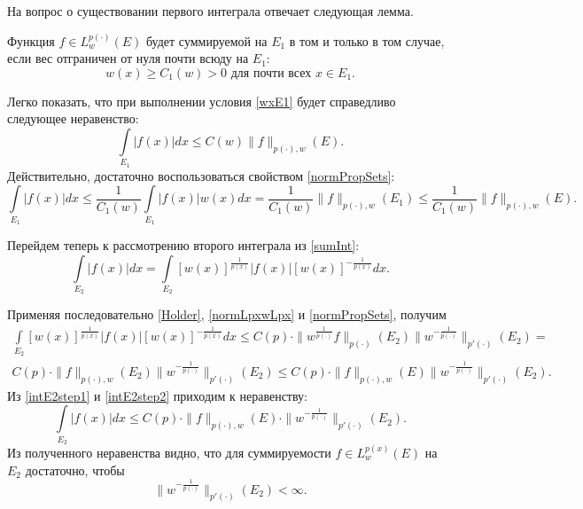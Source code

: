 На вопрос о существовании первого интеграла отвечает следующая лемма.
\begin{lemma}
Функция $f \in L^{p(\cdot)}_w(E)$ будет суммируемой на $E_1$ в том и только в том случае, если вес отграничен от нуля почти всюду на $E_1$:
\begin{equation}\label{wxE1}
  w(x) \ge C_1(w) > 0 \text{ для почти всех } x \in E_1.
\end{equation}
\end{lemma}



Легко показать, что при выполнении условия \eqref{wxE1} будет справедливо следующее неравенство:
\begin{equation}\label{intE1}
  \int\limits_{E_1} |f(x)|dx \le C(w)\|f\|_{p(\cdot),w}(E).
\end{equation}
Действительно, достаточно воспользоваться свойством \ref{normPropSets}:
\begin{equation*}
  \int\limits_{E_1} |f(x)|dx \le
  \frac{1}{C_1(w)}\int\limits_{E_1} |f(x)|w(x)dx =
  \frac{1}{C_1(w)} \|f\|_{p(\cdot),w}(E_1) \le
  \frac{1}{C_1(w)} \|f\|_{p(\cdot),w}(E).
\end{equation*}

Перейдем теперь к рассмотрению второго интеграла из \eqref{sumInt}:
\begin{equation}\label{intE2step1}
  \int\limits_{E_2} |f(x)|dx=
  \int\limits_{E_2} [w(x)]^{\frac{1}{p(x)}}|f(x)|[w(x)]^{-\frac{1}{p(x)}}dx.
\end{equation}

Применяя последовательно \ref{Holder}, \ref{normLpxwLpx} и \ref{normPropSets}, получим
\begin{multline}\label{intE2step2}
  \int\limits_{E_2} [w(x)]^{\frac{1}{p(x)}}|f(x)|[w(x)]^{-\frac{1}{p(x)}}dx \le
  C(p) \cdot \|w^{\frac{1}{p(\cdot)}}f\|_{p(\cdot)}(E_2) \|w^{-\frac{1}{p(\cdot)}}\|_{p'(\cdot)}(E_2)= \\
  C(p) \cdot \|f\|_{p(\cdot),w}(E_2) \|w^{-\frac{1}{p(\cdot)}}\|_{p'(\cdot)}(E_2) \le
  C(p) \cdot \|f\|_{p(\cdot),w}(E) \|w^{-\frac{1}{p(\cdot)}}\|_{p'(\cdot)}(E_2).
\end{multline}
Из \eqref{intE2step1} и \eqref{intE2step2} приходим к неравенству:
\begin{equation}\label{intE2}
  \int\limits_{E_2} |f(x)|dx \le
  C(p) \cdot
  \|f\|_{p(\cdot),w}(E) \cdot
  \|w^{-\frac{1}{p(\cdot)}}\|_{p'(\cdot)}(E_2).
\end{equation}
Из полученного неравенства видно, что для суммируемости $f \in L^{p(x)}_w(E)$ на $E_2$ достаточно, чтобы
\begin{equation*}
  \|w^{-\frac{1}{p(\cdot)}}\|_{p'(\cdot)}(E_2) < \infty.
\end{equation*}

